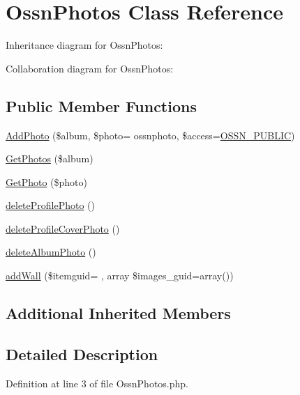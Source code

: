 \hypertarget{class_ossn_photos}{}\section{Ossn\+Photos Class Reference}
\label{class_ossn_photos}


Inheritance diagram for Ossn\+Photos\+:


Collaboration diagram for Ossn\+Photos\+:
\subsection*{Public Member Functions}
\begin{DoxyCompactItemize}
\item 
\hyperlink{class_ossn_photos_afed7c0f2182c11726a3f41f1a93ebe9d}{Add\+Photo} (\$album, \$photo= \textquotesingle{}ossnphoto\textquotesingle{}, \$access=\hyperlink{ossn_8lib_8system_8php_a8efdc824fa9025d0c02ee7c512aafdfa}{O\+S\+S\+N\+\_\+\+P\+U\+B\+L\+IC})
\item 
\hyperlink{class_ossn_photos_abe26ef694047baa004d1594110129120}{Get\+Photos} (\$album)
\item 
\hyperlink{class_ossn_photos_aeb2780167dce3d50f91e1daecf099861}{Get\+Photo} (\$photo)
\item 
\hyperlink{class_ossn_photos_a794643232d6e9aae6ec2f77b20100db7}{delete\+Profile\+Photo} ()
\item 
\hyperlink{class_ossn_photos_aebaa766b616e2279e3ed62fa73a95d26}{delete\+Profile\+Cover\+Photo} ()
\item 
\hyperlink{class_ossn_photos_a21bcd3b91e54782676001b0a84690fb2}{delete\+Album\+Photo} ()
\item 
\hyperlink{class_ossn_photos_a8dbd009c6a0f77e85dba0955de1a1718}{add\+Wall} (\$itemguid= \textquotesingle{}\textquotesingle{}, array \$images\+\_\+guid=array())
\end{DoxyCompactItemize}
\subsection*{Additional Inherited Members}


\subsection{Detailed Description}


Definition at line 3 of file Ossn\+Photos.\+php.



